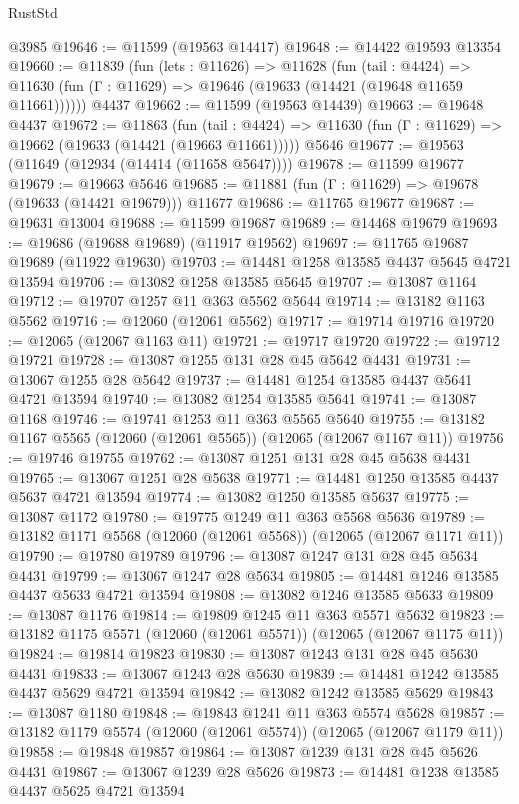 \begin{lexlean}{RustStd}
\begin{coremodule}
    @3985
@19646 := @11599 (@19563 @14417)
@19648 := @14422 @19593 @13354
@19660 := @11839
    (fun (lets : @11626) =>
    @11628
      (fun (tail : @4424) =>
      @11630 (fun (Γ : @11629) => @19646 (@19633 (@14421 (@19648 @11659 @11661))))))
    @4437
@19662 := @11599 (@19563 @14439)
@19663 := @19648 @4437
@19672 := @11863
    (fun (tail : @4424) => @11630 (fun (Γ : @11629) => @19662 (@19633 (@14421 (@19663 @11661)))))
    @5646
@19677 := @19563 (@11649 (@12934 (@14414 (@11658 @5647))))
@19678 := @11599 @19677
@19679 := @19663 @5646
@19685 := @11881 (fun (Γ : @11629) => @19678 (@19633 (@14421 @19679))) @11677
@19686 := @11765 @19677
@19687 := @19631 @13004
@19688 := @11599 @19687
@19689 := @14468 @19679
@19693 := @19686 (@19688 @19689) (@11917 @19562)
@19697 := @11765 @19687 @19689 (@11922 @19630)
@19703 := @14481 @1258 @13585 @4437 @5645 @4721 @13594
@19706 := @13082 @1258 @13585 @5645
@19707 := @13087 @1164
@19712 := @19707 @1257 @11 @363 @5562 @5644
@19714 := @13182 @1163 @5562
@19716 := @12060 (@12061 @5562)
@19717 := @19714 @19716
@19720 := @12065 (@12067 @1163 @11)
@19721 := @19717 @19720
@19722 := @19712 @19721
@19728 := @13087 @1255 @131 @28 @45 @5642 @4431
@19731 := @13067 @1255 @28 @5642
@19737 := @14481 @1254 @13585 @4437 @5641 @4721 @13594
@19740 := @13082 @1254 @13585 @5641
@19741 := @13087 @1168
@19746 := @19741 @1253 @11 @363 @5565 @5640
@19755 := @13182 @1167 @5565 (@12060 (@12061 @5565)) (@12065 (@12067 @1167 @11))
@19756 := @19746 @19755
@19762 := @13087 @1251 @131 @28 @45 @5638 @4431
@19765 := @13067 @1251 @28 @5638
@19771 := @14481 @1250 @13585 @4437 @5637 @4721 @13594
@19774 := @13082 @1250 @13585 @5637
@19775 := @13087 @1172
@19780 := @19775 @1249 @11 @363 @5568 @5636
@19789 := @13182 @1171 @5568 (@12060 (@12061 @5568)) (@12065 (@12067 @1171 @11))
@19790 := @19780 @19789
@19796 := @13087 @1247 @131 @28 @45 @5634 @4431
@19799 := @13067 @1247 @28 @5634
@19805 := @14481 @1246 @13585 @4437 @5633 @4721 @13594
@19808 := @13082 @1246 @13585 @5633
@19809 := @13087 @1176
@19814 := @19809 @1245 @11 @363 @5571 @5632
@19823 := @13182 @1175 @5571 (@12060 (@12061 @5571)) (@12065 (@12067 @1175 @11))
@19824 := @19814 @19823
@19830 := @13087 @1243 @131 @28 @45 @5630 @4431
@19833 := @13067 @1243 @28 @5630
@19839 := @14481 @1242 @13585 @4437 @5629 @4721 @13594
@19842 := @13082 @1242 @13585 @5629
@19843 := @13087 @1180
@19848 := @19843 @1241 @11 @363 @5574 @5628
@19857 := @13182 @1179 @5574 (@12060 (@12061 @5574)) (@12065 (@12067 @1179 @11))
@19858 := @19848 @19857
@19864 := @13087 @1239 @131 @28 @45 @5626 @4431
@19867 := @13067 @1239 @28 @5626
@19873 := @14481 @1238 @13585 @4437 @5625 @4721 @13594

\end{coremodule}
\end{lexlean}
